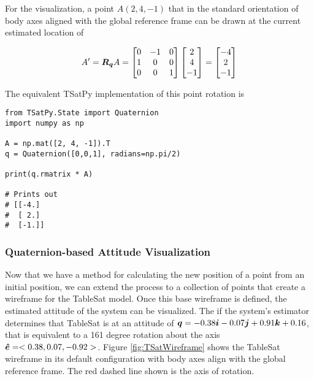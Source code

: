 For the visualization, a point $A (2, 4, -1)$ that in the standard orientation of body axes aligned with the global reference frame can be drawn at the current estimated location of

\begin{equation}
  A' = \boldsymbol{R_q} A = \begin{bmatrix} 0 & -1 & 0 \\ 1 & 0 & 0 \\ 0 & 0 & 1 \\\end{bmatrix} \begin{bmatrix} 2 \\ 4 \\ -1 \end{bmatrix} = \begin{bmatrix} -4 \\ 2 \\ -1 \end{bmatrix}
\end{equation}

The equivalent TSatPy implementation of this point rotation is

\begin{singlespace}
  \begin{verbatim}
from TSatPy.State import Quaternion
import numpy as np

A = np.mat([2, 4, -1]).T
q = Quaternion([0,0,1], radians=np.pi/2)

print(q.rmatrix * A)

# Prints out
# [[-4.]
#  [ 2.]
#  [-1.]]
  \end{verbatim}
  \nocite{minted}
\end{singlespace}


\subsubsection{Quaternion-based Attitude Visualization}
\label{subsubsec:QuaternionbasedAttitudeVisualization}

Now that we have a method for calculating the new position of a point from an initial position, we can extend the process to a collection of points that create a wireframe for the TableSat model.  Once this base wireframe is defined, the estimated attitude of the system can be visualized.  The if the system's estimator determines that TableSat is at an attitude of $\boldsymbol{q} = -0.38\boldsymbol{i}-0.07\boldsymbol{j}+0.91\boldsymbol{k}+0.16$, that is equivalent to a 161 degree rotation about the axis $\boldsymbol{\hat{e}} = <0.38, 0.07, -0.92>$.  Figure \ref{fig:TSatWireframe} shows the TableSat wireframe in its default configuration with body axes align with the global reference frame.  The red dashed line shown is the axis of rotation.

